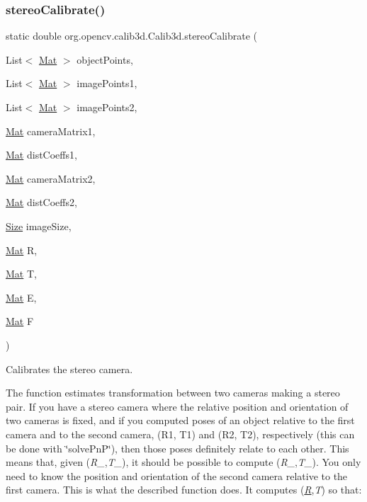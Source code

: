 \subsubsection{\texorpdfstring{stereo\+Calibrate()}{stereoCalibrate()}\hspace{0.1cm}{\footnotesize\ttfamily [2/2]}}
{\footnotesize\ttfamily static double org.\+opencv.\+calib3d.\+Calib3d.\+stereo\+Calibrate (\begin{DoxyParamCaption}\item[{List$<$ \mbox{\hyperlink{classorg_1_1opencv_1_1core_1_1_mat}{Mat}} $>$}]{object\+Points,  }\item[{List$<$ \mbox{\hyperlink{classorg_1_1opencv_1_1core_1_1_mat}{Mat}} $>$}]{image\+Points1,  }\item[{List$<$ \mbox{\hyperlink{classorg_1_1opencv_1_1core_1_1_mat}{Mat}} $>$}]{image\+Points2,  }\item[{\mbox{\hyperlink{classorg_1_1opencv_1_1core_1_1_mat}{Mat}}}]{camera\+Matrix1,  }\item[{\mbox{\hyperlink{classorg_1_1opencv_1_1core_1_1_mat}{Mat}}}]{dist\+Coeffs1,  }\item[{\mbox{\hyperlink{classorg_1_1opencv_1_1core_1_1_mat}{Mat}}}]{camera\+Matrix2,  }\item[{\mbox{\hyperlink{classorg_1_1opencv_1_1core_1_1_mat}{Mat}}}]{dist\+Coeffs2,  }\item[{\mbox{\hyperlink{classorg_1_1opencv_1_1core_1_1_size}{Size}}}]{image\+Size,  }\item[{\mbox{\hyperlink{classorg_1_1opencv_1_1core_1_1_mat}{Mat}}}]{R,  }\item[{\mbox{\hyperlink{classorg_1_1opencv_1_1core_1_1_mat}{Mat}}}]{T,  }\item[{\mbox{\hyperlink{classorg_1_1opencv_1_1core_1_1_mat}{Mat}}}]{E,  }\item[{\mbox{\hyperlink{classorg_1_1opencv_1_1core_1_1_mat}{Mat}}}]{F }\end{DoxyParamCaption})\hspace{0.3cm}{\ttfamily [static]}}

Calibrates the stereo camera.

The function estimates transformation between two cameras making a stereo pair. If you have a stereo camera where the relative position and orientation of two cameras is fixed, and if you computed poses of an object relative to the first camera and to the second camera, (R1, T1) and (R2, T2), respectively (this can be done with \char`\"{}solve\+Pn\+P\char`\"{}), then those poses definitely relate to each other. This means that, given ({\itshape R\+\_},{\itshape T\+\_}), it should be possible to compute ({\itshape R\+\_},{\itshape T\+\_}). You only need to know the position and orientation of the second camera relative to the first camera. This is what the described function does. It computes ({\itshape \mbox{\hyperlink{classorg_1_1opencv_1_1_r}{R}}},{\itshape T}) so that\+:

